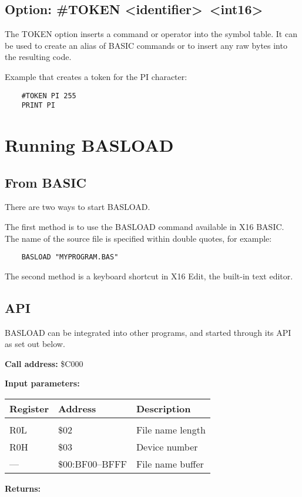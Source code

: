 \documentclass{article}
\begin{document}
    \subsection{Option: \#TOKEN \textless identifier\textgreater \  \textless int16\textgreater }
        The TOKEN option inserts a command or operator into the symbol table. It can be used
        to create an alias of BASIC commands or to insert any raw bytes into the resulting
        code.

        Example that creates a token for the PI character:

        \begin{verbatim}
    #TOKEN PI 255
    PRINT PI
         \end{verbatim}

\section{Running BASLOAD}

    \subsection{From BASIC}

        There are two ways to start BASLOAD.

        The first method is to use the BASLOAD command available in X16 BASIC. The
        name of the source file is specified within double quotes, for example:

        \begin{verbatim}
    BASLOAD "MYPROGRAM.BAS"
        \end{verbatim}

        The second method is a keyboard shortcut in X16 Edit, the built-in text editor.

    \subsection{API}

        BASLOAD can be integrated into other programs, and started through its
        API as set out below.

        \vspace{1em}
        \textbf{Call address:} \$C000

        \textbf{Input parameters:} 

        \begin{longtable}[l]{l l p{6cm}}
            \textbf{Register} & \textbf{Address} & \textbf{Description} \\
	        \hline \\
            R0L & \$02            & File name length \\
            R0H & \$03            & Device number \\
            ---  & \$00:BF00--BFFF & File name buffer \\
        \end{longtable}
        \vspace{-1.5em}
        \textbf{Returns:} 
\end{document}
